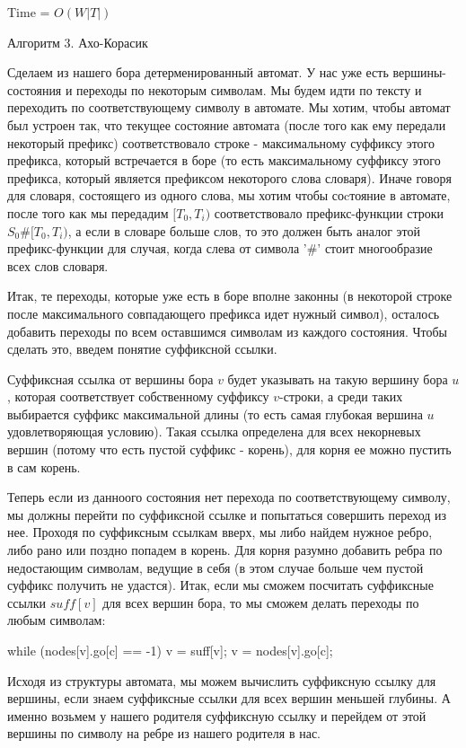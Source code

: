 Time =  $O(W |T|)$

Алгоритм 3. Ахо-Корасик

Сделаем из нашего бора детерменированный автомат. У нас уже есть вершины-состояния и переходы по некоторым символам. Мы будем идти по тексту и переходить по соответствующему символу в автомате. Мы хотим, чтобы автомат был устроен так, что текущее состояние автомата (после того как ему передали некоторый префикс) соответствовало строке - максимальному суффиксу этого префикса, который встречается в боре (то есть максимальному суффиксу этого префикса, который является префиксом некоторого слова словаря). Иначе говоря для словаря, состоящего из одного слова, мы хотим чтобы соcтояние в автомате, после того как мы передадим $[T_0, T_i)$ соответствовало префикс-функции строки $S_0\#[T_0, T_i)$, а если в словаре больше слов, то это должен быть аналог этой префикс-функции для случая, когда слева от символа '\#' стоит многообразие всех слов словаря.

Итак, те переходы, которые уже есть в боре вполне законны (в некоторой строке после максимального совпадающего префикса идет нужный символ), осталось добавить переходы по всем оставшимся символам из каждого состояния. Чтобы сделать это, введем понятие суффиксной ссылки. 

Суффиксная ссылка от вершины бора $v$ будет указывать на такую вершину бора $u$, которая соответствует собственному суффиксу $v$-строки, а среди таких выбирается суффикс максимальной длины (то есть самая глубокая вершина $u$ удовлетворяющая условию). Такая ссылка определена для всех некорневых вершин (потому что есть пустой суффикс - корень), для корня ее можно пустить в сам корень.

Теперь если из данноого состояния нет перехода по соответствующему символу, мы должны перейти по суффиксной ссылке и попытаться совершить переход из нее. Проходя по суффиксным ссылкам вверх, мы либо найдем нужное ребро, либо рано или поздно попадем в корень. Для корня разумно добавить ребра по недостающим символам, ведущие в себя (в этом случае больше чем пустой суффикс получить не удастся). Итак, если мы сможем посчитать суффиксные ссылки $suff[v]$ для всех вершин бора, то мы сможем делать переходы по любым символам:

\begin{cppcode}
while (nodes[v].go[c] == -1)
	v = suff[v];
v = nodes[v].go[c];
\end{cppcode}

Исходя из структуры автомата, мы можем вычислить суффиксную ссылку для вершины, если знаем суффиксные ссылки для всех вершин меньшей глубины. А именно возьмем у нашего родителя суффиксную ссылку и перейдем от этой вершины по символу на ребре из нашего родителя в нас.

